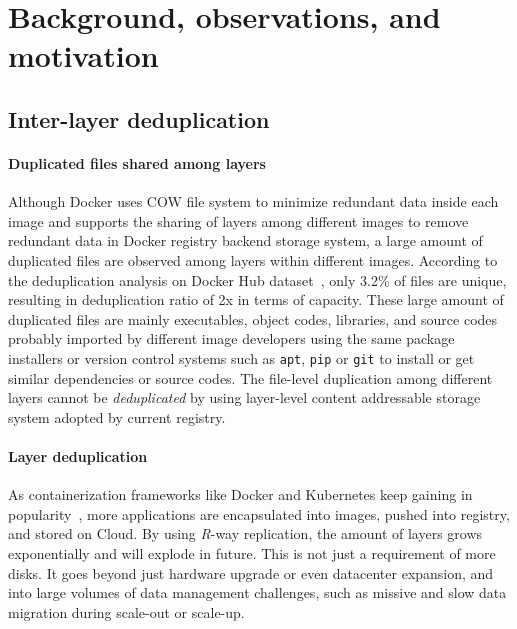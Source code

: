 \section{Background, observations, and motivation}
\label{sec:dataset-analysis}

%
%

%

%

\subsection{Inter-layer deduplication}

\paragraph{Duplicated files shared among layers}
Although Docker uses COW file system to minimize redundant data inside each image and
 supports the sharing of layers among different images to remove redundant data in Docker registry backend storage system,
 a large amount of duplicated files are observed among layers within different images.  
According to the deduplication analysis on Docker Hub dataset~\cite{xxx},
only 3.2\% of files are unique, resulting in deduplication ratio of 2x in terms of capacity. 
These large amount of duplicated files %
are mainly executables, object codes, libraries, and source codes probably
imported by different image developers using the same package installers or version control systems such as
\texttt{apt},  \texttt{pip} or \texttt{git} to install or get similar dependencies or source codes.
The file-level duplication among different layers cannot be \emph{deduplicated} 
by using layer-level content addressable storage system adopted by current registry.

\paragraph{Layer deduplication}
As containerization frameworks like Docker and Kubernetes keep gaining in popularity~\cite{xxxs},
more applications are encapsulated into images, pushed into registry, and stored on Cloud.
By using \emph{R}-way replication, the amount of layers grows exponentially and will explode in future.
This is not just a requirement of more disks.
It goes beyond just hardware upgrade or even datacenter expansion,
and into large volumes of data management challenges, such as missive and slow data migration during scale-out or scale-up.
 
